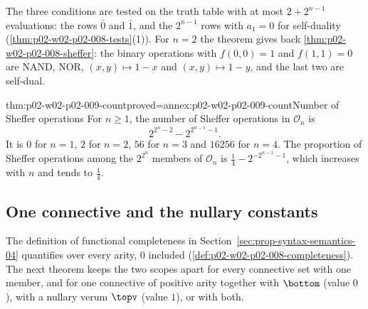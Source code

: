 The three conditions are tested on the truth table with at most
\(2+2^{n-1}\) evaluations: the rows \(\bar0\) and \(\bar1\), and the
\(2^{n-1}\) rows with \(a_1=0\) for self-duality
(\cref{thm:p02-w02-p02-008-tests}(1)).  For \(n=2\) the theorem gives back
\cref{thm:p02-w02-p02-008-sheffer}: the binary operations with
\(f(0,0)=1\) and \(f(1,1)=0\) are \(\mathrm{NAND}\), \(\mathrm{NOR}\),
\((x,y)\mapsto1-x\) and \((x,y)\mapsto1-y\), and the last two are self-dual.

\begin{hbcorollary}{thm:p02-w02-p02-009-count}{proved=annex:p02-w02-p02-009-count}{Number of Sheffer operations}
For \(n\geq1\), the number of Sheffer operations in \(\mathcal O_n\) is
\[
  2^{2^n-2}-2^{2^{n-1}-1}.
\]
It is \(0\) for \(n=1\), \(2\) for \(n=2\), \(56\) for \(n=3\) and
\(16256\) for \(n=4\).  The proportion of Sheffer operations among the
\(2^{2^n}\) members of \(\mathcal O_n\) is
\(\tfrac14-2^{-2^{n-1}-1}\), which increases with \(n\) and tends to
\(\tfrac14\).
\end{hbcorollary}

\subsection{One connective and the nullary constants}
\label{sec:p02-w02-p02-009-scope}

The definition of functional completeness in
Section~\ref{sec:prop-syntax-semantics-04} quantifies over every arity, \(0\)
included (\cref{def:p02-w02-p02-008-completeness}).  The next theorem keeps
the two scopes apart for every connective set with one member, and for one
connective of positive arity together with \(\bottom\) (value \(0\)), with a
nullary verum \(\topv\) (value \(1\)), or with both.

